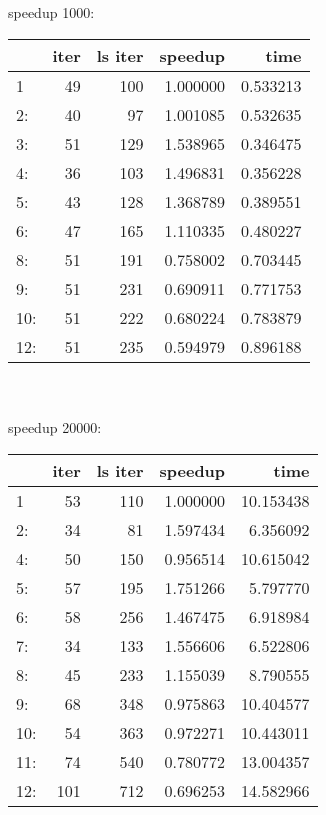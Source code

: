 \documentclass[11pt,a4paper]{article}
\begin{document}
\\ 
\\ 
speedup 1000:
\\ 
\begin{tabular}{lrrrr}
\toprule
{} &  iter &  ls iter &   speedup &      time \\
\midrule
1   &    49 &      100 &  1.000000 &  0.533213 \\
2:  &    40 &       97 &  1.001085 &  0.532635 \\
3:  &    51 &      129 &  1.538965 &  0.346475 \\
4:  &    36 &      103 &  1.496831 &  0.356228 \\
5:  &    43 &      128 &  1.368789 &  0.389551 \\
6:  &    47 &      165 &  1.110335 &  0.480227 \\
8:  &    51 &      191 &  0.758002 &  0.703445 \\
9:  &    51 &      231 &  0.690911 &  0.771753 \\
10: &    51 &      222 &  0.680224 &  0.783879 \\
12: &    51 &      235 &  0.594979 &  0.896188 \\
\bottomrule
\end{tabular}
\\ 
\\ 
speedup 20000:
\\ 
\begin{tabular}{lrrrr}
\toprule
{} &  iter &  ls iter &   speedup &       time \\
\midrule
1   &    53 &      110 &  1.000000 &  10.153438 \\
2:  &    34 &       81 &  1.597434 &   6.356092 \\
4:  &    50 &      150 &  0.956514 &  10.615042 \\
5:  &    57 &      195 &  1.751266 &   5.797770 \\
6:  &    58 &      256 &  1.467475 &   6.918984 \\
7:  &    34 &      133 &  1.556606 &   6.522806 \\
8:  &    45 &      233 &  1.155039 &   8.790555 \\
9:  &    68 &      348 &  0.975863 &  10.404577 \\
10: &    54 &      363 &  0.972271 &  10.443011 \\
11: &    74 &      540 &  0.780772 &  13.004357 \\
12: &   101 &      712 &  0.696253 &  14.582966 \\
\bottomrule
\end{tabular}
\end{document}
